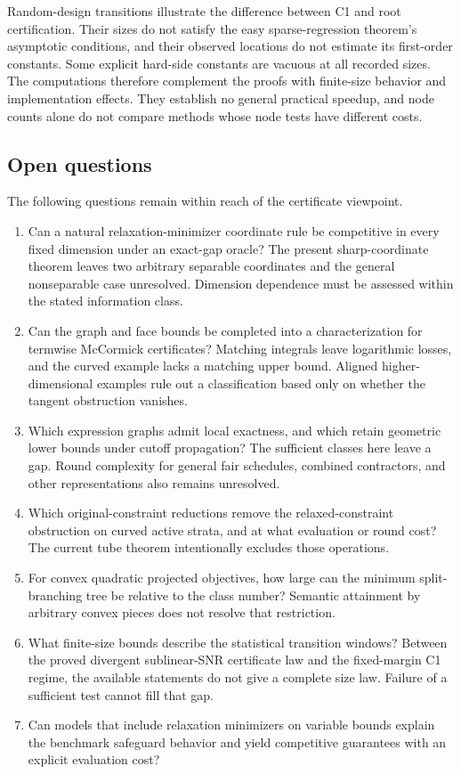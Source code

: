 Random-design transitions illustrate the difference between C1 and root
certification. Their sizes do not satisfy the easy sparse-regression
theorem's asymptotic conditions, and their observed locations do not estimate
its first-order constants. Some explicit hard-side constants are vacuous
at all recorded sizes. The computations therefore complement the proofs
with finite-size behavior and implementation effects. They establish no
general practical speedup, and node counts alone do not compare methods
whose node tests have different costs.

\subsection{Open questions}\label{discussion:open}

The following questions remain within reach of the certificate viewpoint.
\begin{enumerate}
\item Can a natural relaxation-minimizer coordinate rule be competitive in
  every fixed dimension under an exact-gap oracle? The present
  sharp-coordinate theorem leaves two arbitrary separable coordinates and
  the general nonseparable case unresolved. Dimension dependence must be
  assessed within the stated information class.
\item Can the graph and face bounds be completed into a characterization
  for termwise McCormick certificates? Matching integrals leave logarithmic
  losses, and the curved example lacks a matching upper bound. Aligned
  higher-dimensional examples rule out a classification based only on
  whether the tangent obstruction vanishes.
\item Which expression graphs admit local exactness, and which retain
  geometric lower bounds under cutoff propagation? The sufficient classes
  here leave a gap. Round complexity for general fair schedules, combined
  contractors, and other representations also remains unresolved.
\item Which original-constraint reductions remove the relaxed-constraint
  obstruction on curved active strata, and at what evaluation or round
  cost? The current tube theorem intentionally excludes those operations.
\item For convex quadratic projected objectives, how large can the minimum
  split-branching tree be relative to the class number? Semantic attainment
  by arbitrary convex pieces does not resolve that restriction.
\item What finite-size bounds describe the statistical transition windows?
  Between the proved divergent sublinear-SNR certificate law and the fixed-margin C1
  regime, the available statements do not give a complete size law. Failure
  of a sufficient test cannot fill that gap.
\item Can models that include relaxation minimizers on variable bounds
  explain the benchmark safeguard behavior and yield competitive guarantees
  with an explicit evaluation cost?
\end{enumerate}
